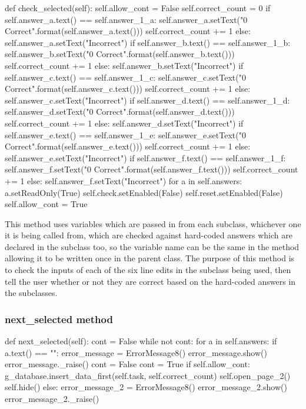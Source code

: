 \begin{python}
def check_selected(self):
        self.allow_cont = False
        self.correct_count = 0
        if self.answer_a.text() == self.answer_1_a:
            self.answer_a.setText("{0} Correct".format(self.answer_a.text()))
            self.correct_count += 1
        else:
            self.answer_a.setText("Incorrect")
        if self.answer_b.text() == self.answer_1_b:
            self.answer_b.setText("{0} Correct".format(self.answer_b.text()))
            self.correct_count += 1
        else:
            self.answer_b.setText("Incorrect")
        if self.answer_c.text() == self.answer_1_c:
            self.answer_c.setText("{0} Correct".format(self.answer_c.text()))
            self.correct_count += 1
        else:
            self.answer_c.setText("Incorrect")
        if self.answer_d.text() == self.answer_1_d:
            self.answer_d.setText("{0} Correct".format(self.answer_d.text()))
            self.correct_count += 1
        else:
            self.answer_d.setText("Incorrect")
        if self.answer_e.text() == self.answer_1_e:
            self.answer_e.setText("{0} Correct".format(self.answer_e.text()))
            self.correct_count += 1
        else:
            self.answer_e.setText("Incorrect")
        if self.answer_f.text() == self.answer_1_f:
            self.answer_f.setText("{0} Correct".format(self.answer_f.text()))
            self.correct_count += 1
        else:
            self.answer_f.setText("Incorrect")
        for a in self.answers:
            a.setReadOnly(True)
        self.check.setEnabled(False)
        self.reset.setEnabled(False)
        self.allow_cont = True
\end{python}

This method uses variables which are passed in from each subclass, whichever one it is being called from, which are checked against hard-coded answers which are declared in the subclass too, so the variable name can be the same in the method allowing it to be written once in the parent class. The purpose of this method is to check the inputs of each of the six line edits in the subclass being used, then tell the user whether or not they are correct based on the hard-coded answers in the subclasses.

\subsubsection{next\_selected method}

\begin{python}
def next_selected(self):
        cont = False
        while not cont:
            for a in self.answers:
                if a.text() == "":
                    error_message = ErrorMessage8()
                    error_message.show()
                    error_message._raise()
                    cont = False
            cont = True
            if self.allow_cont:
                g_database.insert_data_first(self.task, self.correct_count)
                self.open_page_2()
                self.hide()
            else:
                error_message_2 = ErrorMessage8()
                error_message_2.show()
                error_message_2._raise()
\end{python}

